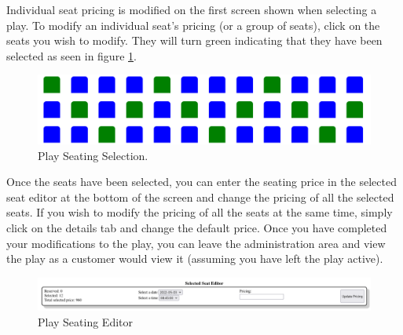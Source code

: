 Individual seat pricing is modified on the first screen shown when selecting a play. To modify an individual seat's pricing (or a group of seats), click on the seats you wish to modify. They will turn green indicating that they have been selected as seen in figure \ref{fig:admin_area_seat_selected}.

\begin{figure}[ht]
    \centering
    \includegraphics[width=12cm]{images/chapter2/admin area seat selected}
    \caption{Play Seating Selection.}
    \label{fig:admin_area_seat_selected}
\end{figure}

Once the seats have been selected, you can enter the seating price in the selected seat editor at the bottom of the screen and change the pricing of all the selected seats. If you wish to modify the pricing of all the seats at the same time, simply click on the details tab and change the default price. Once you have completed your modifications to the play, you can leave the administration area and view the play as a customer would view it (assuming you have left the play active).

\begin{figure}[ht]
    \centering
    \includegraphics[width=12cm]{images/chapter2/admin area seat editor}
    \caption{Play Seating Editor}
    \label{fig:admin_area_seat_editor}
\end{figure}
